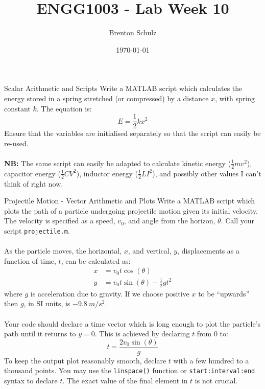 \documentclass{lab}
\title{ENGG1003 - Lab Week 10}
\author{Brenton Schulz}
\date{\today}
\begin{document}
\maketitle

\begin{task}{Scalar Arithmetic and Scripts}{}
Write a MATLAB script which calculates the energy stored in a spring stretched (or compressed) by a distance $x$, with spring constant $k$. The equation is:
\begin{equation*}
E = \frac{1}{2}k x^2
\end{equation*}
Ensure that the variables are initialised separately so that the script can easily be re-used.
\\~\\
\textbf{NB:} The same script can easily be adapted to calculate kinetic energy ($\frac{1}{2}m v^2$), capacitor energy ($\frac{1}{2}C V^2$), inductor energy ($\frac{1}{2}L I^2$), and possibly other values I can't think of right now.
\end{task}

\begin{task}{Projectile Motion - Vector Arithmetic and Plots}{}
Write a MATLAB script which plots the path of a particle undergoing projectile motion given its initial velocity. The velocity is specified as a speed, $v_0$, and angle from the horizon, $\theta$. Call your script \texttt{projectile.m}.
\\~\\
As the particle moves, the horizontal, $x$, and vertical, $y$, displacements as a function of time, $t$, can be calculated as:
\begin{align*}
x &= v_0 t \cos(\theta) \\
y &= v_0 t \sin(\theta) - \frac{1}{2}g t^2
\end{align*}
where $g$ is acceleration due to gravity. If we choose positive $x$ to be ``upwards'' then $g$, in SI units, is $-9.8~{m/s^2}$.
\\~\\
Your code should declare a time vector which is long enough to plot the particle's path until it returns to $y=0$. This is achieved by declaring $t$ from 0 to:
\begin{equation*}
t = \frac{2 v_0 \sin(\theta)}{g}
\end{equation*}
To keep the output plot reasonably smooth, declare $t$ with a few hundred to a thousand points. You may use the \texttt{linspace()} function or \texttt{start:interval:end} syntax to declare $t$. The exact value of the final element in $t$ is not crucial.
\\~\\
\end{task}
\end{document}
